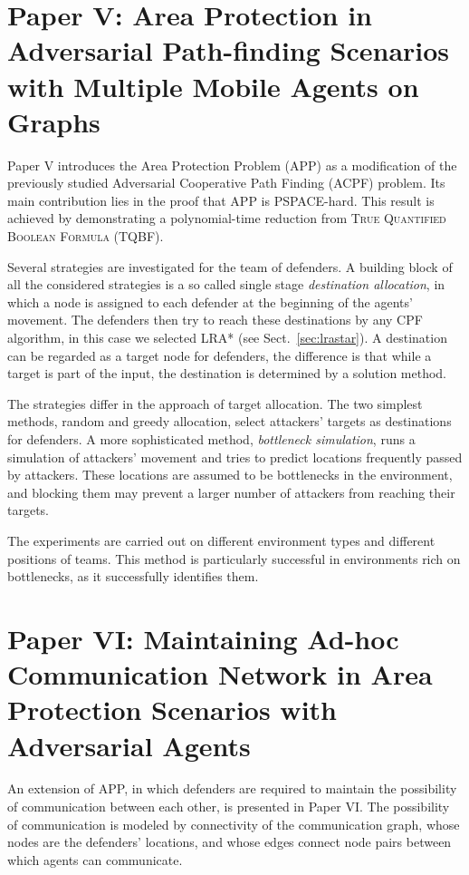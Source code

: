 %
%
\section{Paper V: Area Protection in Adversarial Path-finding Scenarios with Multiple Mobile Agents on Graphs}

Paper V introduces the Area Protection Problem (APP) as a modification of the previously studied Adversarial Cooperative Path Finding (ACPF) \cite{ivanova14} problem.
Its main contribution lies in the proof that APP is PSPACE-hard.
This result is achieved by demonstrating a polynomial-time reduction from \textsc{True Quantified Boolean Formula} (TQBF).

Several strategies are investigated for the team of defenders.
A building block of all the considered strategies is a so called single stage \emph{destination allocation}, in which a node is assigned to each defender at the beginning of the agents' movement.
The defenders then try to reach these destinations by any CPF algorithm, in this case we selected LRA* (see Sect.~\ref{sec:lrastar}).
A destination can be regarded as a target node for defenders, the difference is that while a target is part of the input, the destination is determined by a solution method.

The strategies differ in the approach of target allocation.
The two simplest methods, random and greedy allocation, select attackers' targets as destinations for defenders.
A more sophisticated method, \emph{bottleneck simulation}, runs a simulation of attackers' movement and tries to predict locations frequently passed by attackers.
These locations are assumed to be bottlenecks in the environment, and blocking them may prevent a larger number of attackers from reaching their targets.

The experiments are carried out on different environment types and different positions of teams.
This method is particularly successful in environments rich on bottlenecks, as it successfully identifies them.
%
%
\section{Paper VI: Maintaining Ad-hoc Communication Network in Area Protection Scenarios with Adversarial Agents}

An extension of APP, in which defenders are required to maintain the possibility of communication between each other, is presented in Paper VI.
The possibility of communication is modeled by connectivity of the communication graph, whose nodes are the defenders' locations, 
and whose edges connect node pairs between which agents can communicate. 

